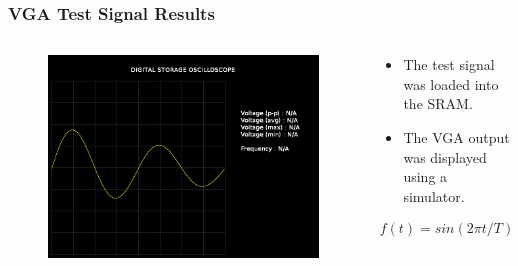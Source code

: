 \documentclass{beamer}
\begin{document}
\begin{frame}
\frametitle{VGA Test Signal Results}

\begin{columns}[onlytextwidth]
  \begin{column}{0.5\linewidth}
  
  	\begin{figure}[!htb]
      \includegraphics[width=\linewidth]{vga_test_signal1_results.png}
	\end{figure}
    
  \end{column}
  \begin{column}{0.45\linewidth}
  
  	\begin{itemize}
      \item The test signal was loaded into the SRAM.
      \item The VGA output was displayed using a simulator.
	\end{itemize}
    
  	\[ f(t) = sin( {2 \pi t}/{T} ) e^{{-t}/{2 T}} \]
    
  \end{column}
\end{columns}

\end{frame}
\end{document}
